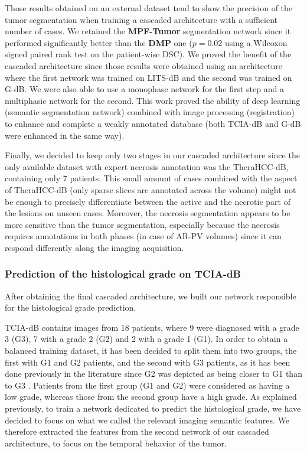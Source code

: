 \documentclass[]{article}
\newcommand{\pplfont}[1]{{\textbf{\fontfamily{ppl}\selectfont #1}}}
\newcommand{\lmttfont}[1]{{\fontfamily{lmtt}\selectfont #1}}
\begin{document}
Those results obtained on an external dataset tend to show the precision
of the tumor segmentation when training a cascaded architecture with a
sufficient number of cases.
We retained the \pplfont{MPF-Tumor} segmentation network since it performed
significantly better than the \pplfont{DMP} one ($ p = 0.02 $ using a Wilcoxon signed
paired rank test on the patient-wise DSC).
We proved the benefit of the cascaded architecture since those results
were obtained using an architecture where the first network was trained
on \lmttfont{LITS-dB} and the second was trained on \lmttfont{G-dB}. We were also able to use
a monophase network for the first step and a multiphasic network for the
second.
This work proved the ability of deep learning (semantic segmentation
network) combined with image processing (registration) to enhance and
complete a weakly annotated database (both \lmttfont{TCIA-dB} and \lmttfont{G-dB} were
enhanced in the same way).

Finally, we decided to keep only two stages in our cascaded architecture
since the only available dataset with expert necrosis annotation was the
\lmttfont{TheraHCC-dB}, containing only 7 patients. This small amount of cases
combined with the aspect of \lmttfont{TheraHCC-dB} (only sparse slices are
annotated across the volume) might not be enough to precisely
differentiate between the active and the necrotic part of the lesions on
unseen cases. Moreover, the necrosis segmentation appears to be more
sensitive than the tumor segmentation, especially because the necrosis
requires annotations in both phases (in case of AR-PV volumes) since it
can respond differently along the imaging acquisition.

\subsubsection{Prediction of the histological grade on
TCIA-dB}\label{prediction-of-the-histological-grade-on-tcia-db}

After obtaining the final cascaded architecture, we built our network responsible for the
histological grade prediction.

\lmttfont{TCIA-dB} contains images from 18 patients, where 9 were diagnosed with a
grade 3 (G3), 7 with a grade 2 (G2) and 2 with a grade 1 (G1). In order
to obtain a balanced training dataset, it has been decided to split them
into two groups, the first with G1 and G2 patients, and the second with
G3 patients, as it has been done previously in the literature since G2
was depicted as being closer to G1 than to G3 \cite{Han2013,Zucman-Rossi2015}. Patients from the first group (G1 and G2) were considered as
having a low grade, whereas those from the second group have a high
grade.
As explained previously, to train a network dedicated to predict the
histological grade, we have decided to focus on what we called the
relevant imaging semantic features.
We therefore extracted the features from the second network of our
cascaded architecture, to focus on the temporal behavior of the tumor.
\end{document}
